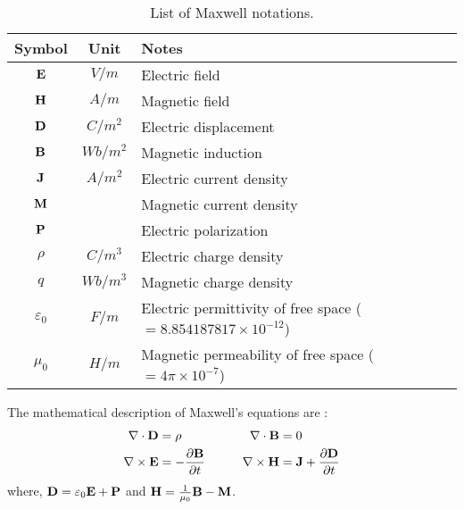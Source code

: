\begin{table}[h]
	\centering
	\caption[List of Maxwell notations]{\label{tab:background:notation2}
		List of Maxwell notations.
	}
	\begin{tabular}{ccl}
		Symbol & Unit & Notes \\
		\hline
		$\mathbf{E}$ & $V/m$      & Electric field \\
		$\mathbf{H}$ & $A/m$      & Magnetic field \\
		$\mathbf{D}$ & $C/m^2$    & Electric displacement \\
		$\mathbf{B}$ & $Wb/m^2$   & Magnetic induction \\
		$\mathbf{J}$ & $A/m^2$    & Electric current density \\
		$\mathbf{M}$ &            & Magnetic current density \\
		$\mathbf{P}$ &            & Electric polarization \\
		$\rho$ & $C/m^3$    & Electric charge density \\
		$q$    & $Wb/m^3$   & Magnetic charge density \\
		$\varepsilon_0$     & $F/m$ & Electric permittivity of free space ($=8.854187817\times10^{-12}$) \\
		$\mu_0$             & $H/m$ & Magnetic permeability of free space ($=4\pi\times10^{-7}$) \\
	\end{tabular}
\end{table}

The mathematical description of Maxwell’s equations are \cite{bohren2008absorption}:
\begin{equation}
	\begin{aligned}
		\nabla\cdot\mathbf{D}  &= \rho & & & & & \nabla\cdot\mathbf{B} &= 0 \\
		\nabla\times\mathbf{E} &= -\frac{\partial\mathbf{B}}{\partial t} & & & & & 
		\nabla\times\mathbf{H} &= \mathbf{J} + \frac{\partial\mathbf{D}}{\partial t}
  \end{aligned}
\end{equation}
where, $\mathbf{D} = \varepsilon_0\mathbf{E} + \mathbf{P}$ and 
	$\mathbf{H} = \frac{1}{\mu_0}\mathbf{B} - \mathbf{M}$.

